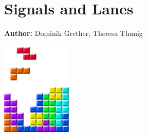\chapter{Signals and Lanes }
\label{ch:signalslanes}

\hfill \textbf{Author:} Dominik Grether, Theresa Thunig

\begin{center} \includegraphics[width=0.25\textwidth, angle=0]{figures/matsimBook.png} \end{center}


